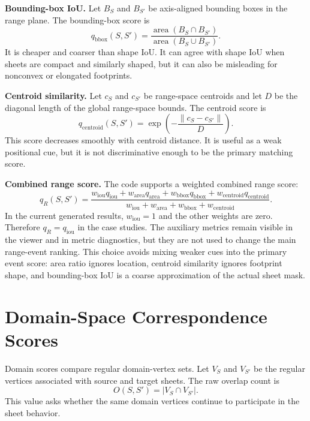 \documentclass{vgtc}
\newcommand{\Sheet}{S}
\newcommand{\myparagraph}[1]{\vspace{1mm} \noindent \textbf{#1}}
\begin{document}
\myparagraph{Bounding-box IoU.}
Let $B_\Sheet$ and $B_{\Sheet'}$ be axis-aligned bounding boxes in the range plane. The bounding-box score is
$$
q_\mathrm{bbox}(\Sheet,\Sheet')=
\frac{\operatorname{area}(B_\Sheet\cap B_{\Sheet'})}{\operatorname{area}(B_\Sheet\cup B_{\Sheet'})}.
$$
It is cheaper and coarser than shape IoU. It can agree with shape IoU when sheets are compact and similarly shaped, but it can also be misleading for nonconvex or elongated footprints.

\myparagraph{Centroid similarity.}
Let $c_\Sheet$ and $c_{\Sheet'}$ be range-space centroids and let $D$ be the diagonal length of the global range-space bounds. The centroid score is
$$
q_\mathrm{centroid}(\Sheet,\Sheet')=
\exp\left(-\frac{\|c_\Sheet-c_{\Sheet'}\|}{D}\right).
$$
This score decreases smoothly with centroid distance. It is useful as a weak positional cue, but it is not discriminative enough to be the primary matching score.

\myparagraph{Combined range score.}
The code supports a weighted combined range score:
$$
q_R(\Sheet,\Sheet')=
\frac{
w_\mathrm{iou}q_\mathrm{iou}
+w_\mathrm{area}q_\mathrm{area}
+w_\mathrm{bbox}q_\mathrm{bbox}
+w_\mathrm{centroid}q_\mathrm{centroid}
}{
w_\mathrm{iou}+w_\mathrm{area}+w_\mathrm{bbox}+w_\mathrm{centroid}
}.
$$
In the current generated results, $w_\mathrm{iou}=1$ and the other weights are zero. Therefore $q_R=q_\mathrm{iou}$ in the case studies. The auxiliary metrics remain visible in the viewer and in metric diagnostics, but they are not used to change the main range-event ranking. This choice avoids mixing weaker cues into the primary event score: area ratio ignores location, centroid similarity ignores footprint shape, and bounding-box IoU is a coarse approximation of the actual sheet mask.

\section{Domain-Space Correspondence Scores}

Domain scores compare regular domain-vertex sets. Let $V_\Sheet$ and $V_{\Sheet'}$ be the regular vertices associated with source and target sheets. The raw overlap count is
$$
O(\Sheet,\Sheet')=|V_\Sheet\cap V_{\Sheet'}|.
$$
This value asks whether the same domain vertices continue to participate in the sheet behavior.
\end{document}
